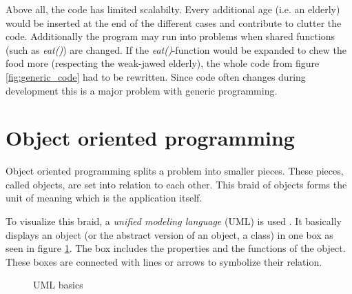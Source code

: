 Above all, the code has limited scalabilty. Every additional age (i.e. an elderly) would be inserted at the end of the different cases and contribute to clutter the code. Additionally the program may run into problems when shared functions (such as \emph{eat()}) are changed. If the \emph{eat()}-function would be expanded to chew the food more (respecting the weak-jawed elderly), the whole code from figure \ref{fig:generic_code} had to be rewritten. Since code often changes during development \cite{Sweigart2014WhyisObject} this is a major problem with generic programming.

\section{Object oriented programming}
Object oriented programming splits a problem into smaller pieces. These pieces, called objects, are set into relation to each other. This braid of objects forms the unit of meaning which is the application itself.

To visualize this braid, a \emph{unified modeling language} (UML) is used \cite{Rumbaugh2005unifiedmodelinglanguage}. It basically displays an object (or the abstract version of an object, a class) in one box as seen in figure \ref{fig:uml_basics}. The box includes the properties and the functions of the object. These boxes are connected with lines or arrows to symbolize their relation.
\begin{figure}[!h]
\begin{center}
\end{center}
\caption{UML basics}
\label{fig:uml_basics}
\end{figure}


